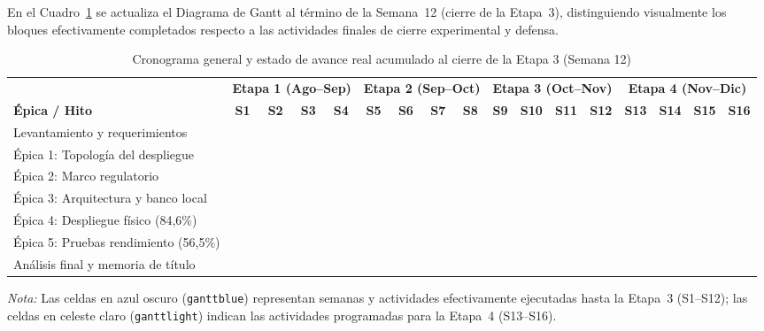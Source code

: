 \documentclass[12pt,oneside,openany,spanish,oldfontcommands]{memoir}
\renewcommand{\arraystretch}{1.15}
\begin{document}
En el Cuadro~\ref{tab:gantt-etapa3} se actualiza el Diagrama de Gantt al término de la Semana~12
(cierre de la Etapa~3), distinguiendo visualmente los bloques efectivamente completados respecto a
las actividades finales de cierre experimental y defensa.

\begin{table}[!htbp]
\centering
\caption{Cronograma general y estado de avance real acumulado al cierre de la Etapa 3 (Semana 12)}
\label{tab:gantt-etapa3}
\tiny
\setlength{\tabcolsep}{2.2pt}
\renewcommand{\arraystretch}{1.2}
\begin{tabularx}{\textwidth}{>{\raggedright\arraybackslash}X *{4}{c} | *{4}{c} | *{4}{c} | *{4}{c}}
\toprule
& \multicolumn{4}{c|}{\textbf{Etapa 1 (Ago--Sep)}}
& \multicolumn{4}{c|}{\textbf{Etapa 2 (Sep--Oct)}}
& \multicolumn{4}{c|}{\textbf{Etapa 3 (Oct--Nov)}}
& \multicolumn{4}{c}{\textbf{Etapa 4 (Nov--Dic)}} \\
\textbf{Épica / Hito}
& \textbf{S1} & \textbf{S2} & \textbf{S3} & \textbf{S4}
& \textbf{S5} & \textbf{S6} & \textbf{S7} & \textbf{S8}
& \textbf{S9} & \textbf{S10} & \textbf{S11} & \textbf{S12}
& \textbf{S13} & \textbf{S14} & \textbf{S15} & \textbf{S16} \\
\midrule
Levantamiento y requerimientos &
\cellcolor{ganttblue} & \cellcolor{ganttblue} & \cellcolor{ganttblue} & \cellcolor{ganttblue} &
& & & & & & & & & & & \\
Épica 1: Topología del despliegue &
& & & &
\cellcolor{ganttblue} & \cellcolor{ganttblue} & & &
\cellcolor{ganttblue} & & & & & & & \\
Épica 2: Marco regulatorio &
& & & &
\cellcolor{ganttblue} & & & &
& & & & & & & \\
Épica 3: Arquitectura y banco local &
& & & &
& \cellcolor{ganttblue} & \cellcolor{ganttblue} & &
\cellcolor{ganttblue} & \cellcolor{ganttblue} & & & & & & \\
Épica 4: Despliegue físico (84,6\%) &
& & & &
& & \cellcolor{ganttblue} & \cellcolor{ganttblue} &
\cellcolor{ganttblue} & \cellcolor{ganttblue} & \cellcolor{ganttblue} & \cellcolor{ganttblue} &
\cellcolor{ganttlight} & & & \\
Épica 5: Pruebas rendimiento (56,5\%) &
& & & &
& & & \cellcolor{ganttblue} &
& \cellcolor{ganttblue} & \cellcolor{ganttblue} & \cellcolor{ganttblue} &
\cellcolor{ganttlight} & \cellcolor{ganttlight} & & \\
Análisis final y memoria de título &
& & & &
& & & &
& & & \cellcolor{ganttblue} &
& \cellcolor{ganttlight} & \cellcolor{ganttlight} & \cellcolor{ganttlight} \\
\bottomrule
\end{tabularx}
\vspace{0.2cm}
\scriptsize
\textit{Nota:} Las celdas en azul oscuro (\texttt{ganttblue}) representan semanas y actividades efectivamente ejecutadas hasta la Etapa~3 (S1--S12); las celdas en celeste claro (\texttt{ganttlight}) indican las actividades programadas para la Etapa~4 (S13--S16).
\end{table}
\end{document}
